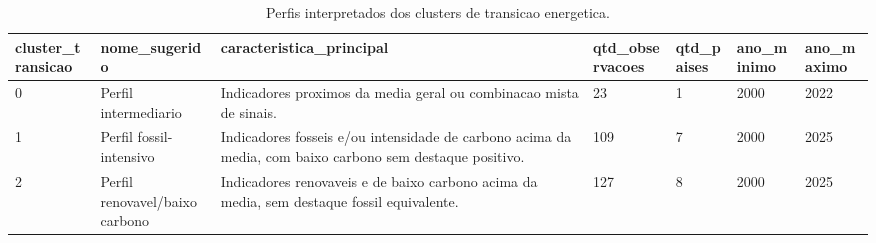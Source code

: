 \begin{table}[htbp]
\centering
\caption{Perfis interpretados dos clusters de transicao energetica.}
\label{tab:perfis-clusters}
\begin{tabular}{lllllll}
\hline
cluster\_transicao & nome\_sugerido & caracteristica\_principal & qtd\_observacoes & qtd\_paises & ano\_minimo & ano\_maximo \\
\hline
0 & Perfil intermediario & Indicadores proximos da media geral ou combinacao mista de sinais. & 23 & 1 & 2000 & 2022 \\
1 & Perfil fossil-intensivo & Indicadores fosseis e/ou intensidade de carbono acima da media, com baixo carbono sem destaque positivo. & 109 & 7 & 2000 & 2025 \\
2 & Perfil renovavel/baixo carbono & Indicadores renovaveis e de baixo carbono acima da media, sem destaque fossil equivalente. & 127 & 8 & 2000 & 2025 \\
\hline
\end{tabular}
\end{table}
